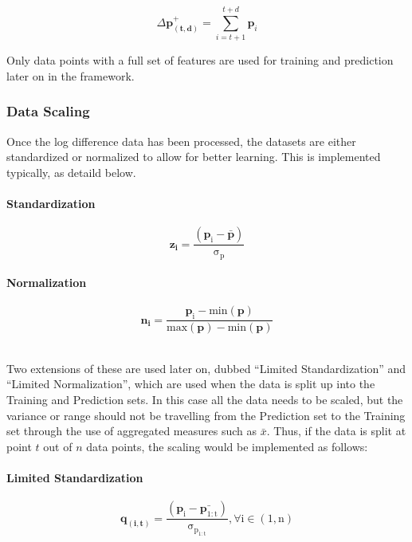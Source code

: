 \documentclass[a4paper,11pt,oneside]{article}
\theoremstyle{plain}
\theoremstyle{definition}
\begin{document}
	\begin{equation}
	\Delta \mathbf{p^{+}_{(t,d)}} = \sum_{i = t+1}^{t+d} \mathbf{p}_i
	\end{equation}
	
	Only data points with a full set of features are used for training and prediction later on in the framework.
	
	\subsubsection{Data Scaling}\label{data_scaling}
	Once the log difference data has been processed, the datasets are either standardized or normalized to allow for better learning. This is implemented typically, as detaild below.
	
	\paragraph{Standardization}
	\begin{equation}
	\mathbf{z_i}= \mathrm{\frac{(\mathbf{p}_i - \mathbf{\bar{p}}) }{\sigma_p}}
	\end{equation}
	
	\paragraph{Normalization}
	
	\begin{equation}\label{eq_ltd_normalization}
	\mathbf{n_i}= \frac{\mathrm{\mathbf{p}_i - min(\mathbf{p}) }}{\mathrm{max(\mathbf{p}) -{min}(\mathbf{p})}}
	\end{equation}
	
	~\\
	Two extensions of these are used later on, dubbed ``Limited Standardization'' and ``Limited Normalization'', which are used when the data is split up into the Training and Prediction sets. In this case all the data needs to be scaled, but the variance or range should not be travelling from the Prediction set to the Training set through the use of aggregated measures such as $\bar{x}$. Thus, if the data is split at point $t$ out of $n$ data points, the scaling would be implemented as follows:
	
	\paragraph{Limited Standardization}
	
	\begin{equation}
	\mathbf{q_{(i, t)}} =\mathrm{ \frac{(\mathbf{p}_i - \bar{\mathbf{p}_{1:t}}) }{\sigma_{p_{1:t}}} , \forall  i \in (1, n)}
	\end{equation}
	
\end{document}
